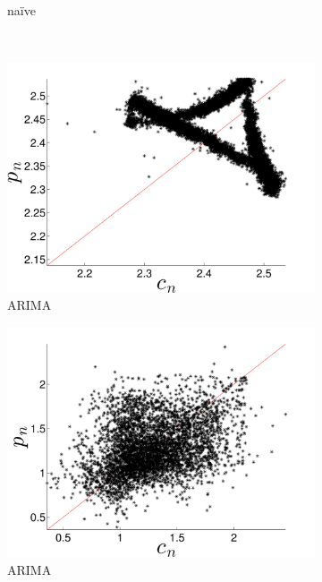 \begin{figure}[htbp]
\begin{subfigure}{0.49\textwidth}
    \caption{\gcc na\"ive }
    \label{fig:gccMEAN}
  \end{subfigure}%
  \\
    \begin{subfigure}{0.49\textwidth}
    \includegraphics[width=\textwidth]{figs/colARIMAForecast}
    \caption{\col ARIMA}
    \label{fig:colARIMA}
  \end{subfigure}
  \begin{subfigure}{0.49\textwidth}
    \includegraphics[width=\textwidth]{figs/gccARIMAForecast}
    \caption{\gcc ARIMA }
    \label{fig:gccARIMA}
  \end{subfigure}%
  \\
      \begin{subfigure}{0.49\textwidth}

\end{subfigure}
\end{figure}
